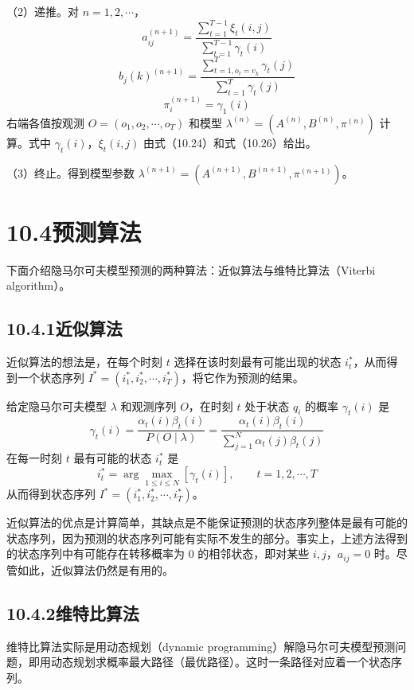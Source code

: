 \documentclass[UTF8,12pt,a4paper,fontset=fandol]{ctexart}
\begin{document}
（2）递推。对 $n=1,2,\cdots$，
\[
  a_{ij}^{(n+1)}
  =\frac{\sum_{t=1}^{T-1}\xi_t(i,j)}{\sum_{t=1}^{T-1}\gamma_t(i)}
\]
\[
  b_j(k)^{(n+1)}
  =\frac{\sum_{t=1,o_t=v_k}^{T}\gamma_t(j)}{\sum_{t=1}^{T}\gamma_t(j)}
\]
\[
  \pi_i^{(n+1)}=\gamma_1(i)
\]
右端各值按观测 $O=(o_1,o_2,\cdots,o_T)$ 和模型 $\lambda^{(n)}=(A^{(n)},B^{(n)},\pi^{(n)})$ 计算。式中 $\gamma_t(i)$，$\xi_t(i,j)$ 由式（10.24）和式（10.26）给出。

（3）终止。得到模型参数 $\lambda^{(n+1)}=(A^{(n+1)},B^{(n+1)},\pi^{(n+1)})$。

\section*{10.4\quad 预测算法}

下面介绍隐马尔可夫模型预测的两种算法：近似算法与维特比算法（Viterbi algorithm）。

\subsection*{10.4.1\quad 近似算法}

近似算法的想法是，在每个时刻 $t$ 选择在该时刻最有可能出现的状态 $i_t^*$，从而得到一个状态序列 $I^*=(i_1^*,i_2^*,\cdots,i_T^*)$，将它作为预测的结果。

给定隐马尔可夫模型 $\lambda$ 和观测序列 $O$，在时刻 $t$ 处于状态 $q_i$ 的概率 $\gamma_t(i)$ 是
\begin{equation}
  \gamma_t(i)=\frac{\alpha_t(i)\beta_t(i)}{P(O\mid\lambda)}
  =\frac{\alpha_t(i)\beta_t(i)}{\sum_{j=1}^N\alpha_t(j)\beta_t(j)}
  \tag{10.42}
\end{equation}
在每一时刻 $t$ 最有可能的状态 $i_t^*$ 是
\begin{equation}
  i_t^*=\arg\max_{1\le i\le N}[\gamma_t(i)],\qquad t=1,2,\cdots,T
  \tag{10.43}
\end{equation}
从而得到状态序列 $I^*=(i_1^*,i_2^*,\cdots,i_T^*)$。

近似算法的优点是计算简单，其缺点是不能保证预测的状态序列整体是最有可能的状态序列，因为预测的状态序列可能有实际不发生的部分。事实上，上述方法得到的状态序列中有可能存在转移概率为 $0$ 的相邻状态，即对某些 $i,j$，$a_{ij}=0$ 时。尽管如此，近似算法仍然是有用的。

\subsection*{10.4.2\quad 维特比算法}

维特比算法实际是用动态规划（dynamic programming）解隐马尔可夫模型预测问题，即用动态规划求概率最大路径（最优路径）。这时一条路径对应着一个状态序列。
\end{document}
